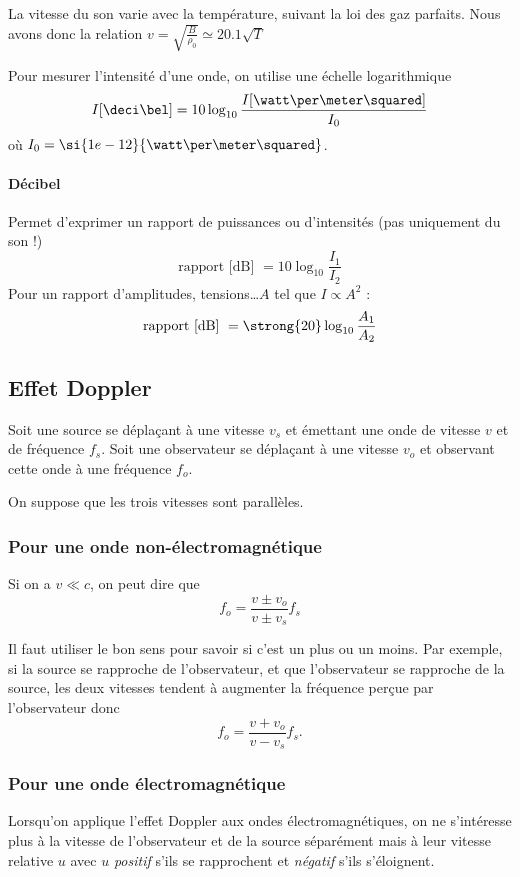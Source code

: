 La vitesse du son varie avec la température, suivant la loi des gaz parfaits.
Nous avons donc la relation $v = \sqrt{\frac{B}{\rho_0}} \simeq 20.1\sqrt{T}$

Pour mesurer l'intensité d'une onde, on utilise une échelle logarithmique
\[ I[\deci\bel] = 10 \log_{10}\frac{I[\watt\per\meter\squared]}{I_0} \]
où $I_0 = \si{1e-12}{\watt\per\meter\squared}$.

\paragraph{Décibel}

Permet d'exprimer un rapport de puissances ou d'intensités
(pas uniquement du son !)
\[\text{rapport [dB] } = 10 \log_{10}\frac{I_1}{I_2}\]
Pour un rapport d'amplitudes, tensions\dots \(A\) tel que \(I \propto A^2\) :
\[\text{rapport [dB] } = \strong{20} \log_{10}\frac{A_1}{A_2}\]

\subsection{Effet Doppler}
Soit une source se déplaçant à une vitesse $v_s$ et émettant
une onde de vitesse $v$ et de fréquence $f_s$.
Soit une observateur se déplaçant à une vitesse $v_o$ et
observant cette onde à une fréquence $f_o$.

On suppose que les trois vitesses sont parallèles.

\subsubsection{Pour une onde non-électromagnétique}
Si on a $v \ll c$, on peut dire que
\[ f_o = \frac{v \pm v_o}{v \pm v_s} f_s \]

Il faut utiliser le bon sens pour savoir si c'est un plus ou un moins.
Par exemple, si la source se rapproche de l'observateur, et que
l'observateur se rapproche de la source, les deux vitesses
tendent à augmenter la fréquence perçue par l'observateur donc
\[ f_o = \frac{v + v_o}{v - v_s} f_s. \]

\subsubsection{Pour une onde électromagnétique}
Lorsqu'on applique l'effet Doppler aux ondes électromagnétiques,
on ne s'intéresse plus à la vitesse de l'observateur et de la source séparément
mais à leur vitesse relative $u$ avec $u$ \emph{positif} s'ils se rapprochent
et \emph{négatif} s'ils s'éloignent.

